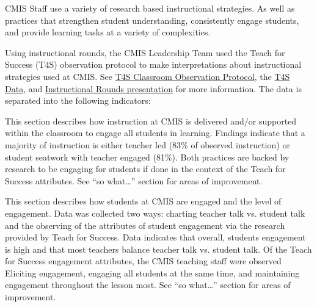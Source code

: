 \documentclass{report}
\begin{document}
\begin{findings}

CMIS Staff use a variety of research based instructional strategies. As well as practices that strengthen student understanding, consistently engage students, and provide learning tasks at a variety of complexities. 

Using instructional rounds, the CMIS Leadership Team used the Teach for Success (T4S) observation protocol to make interpretations about instructional strategies used at CMIS. See \href{https://docs.google.com/a/cmis.ac.th/spreadsheets/d/1ACz3l3DPUgIqRhmZ1LWk9RwVBjo0iLsbJAupJoic5Dg/edit?usp=sharing}{T4S Classroom Observation Protocol}, the \href{https://docs.google.com/a/cmis.ac.th/document/d/1cRvL50iIDvo8s1Gnxoczm82LhSVmEOvCrFksxzHD7ko/edit?usp=sharing}{T4S Data}, and \href{https://docs.google.com/a/cmis.ac.th/presentation/d/1LWASWS2DRPSgW6N4jZdZI4vuHiNOm3UoWzfGe91JdOs/edit?usp=sharing}{Instructional Rounds presentation} for more information. The data is separated into the following indicators:


This section describes how instruction at CMIS is delivered and/or supported within the classroom to engage all students in learning. Findings indicate that a majority of instruction is either teacher led (83\% of observed instruction) or student seatwork with teacher engaged (81\%).  Both practices are backed by research to be engaging for students if done in the context of the Teach for Success attributes.  See “so what…” section for areas of improvement. 


This section describes how students at CMIS are engaged and the level of engagement. Data was collected two ways: charting teacher talk vs. student talk and the observing of the attributes of student engagement via the research provided by Teach for Success. Data indicates that overall, students engagement is high and that most teachers balance teacher talk vs. student talk. Of the Teach for Success engagement attributes, the CMIS teaching staff were observed Eliciting engagement, engaging all students at the same time, and maintaining engagement throughout the lesson most. See “so what…” section for areas of improvement. 



\end{findings}
\end{document}
